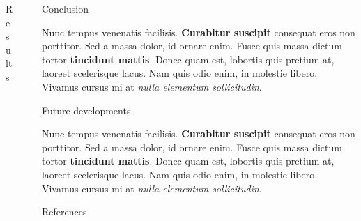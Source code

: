 \documentclass[final]{beamer}
\newlength{\sepwid}
\newlength{\onecolwid}
\begin{document}
\begin{frame}[t]
\begin{columns}[t]
\begin{column}{\onecolwid}
\begin{block}{Results}
\end{block}

\end{column} %

\begin{column}{\sepwid}\end{column} %

\begin{column}{\onecolwid} %


\begin{block}{Conclusion}

Nunc tempus venenatis facilisis. \textbf{Curabitur suscipit} consequat eros non
porttitor. Sed a massa dolor, id ornare enim. Fusce quis massa dictum tortor
\textbf{tincidunt mattis}. Donec quam est, lobortis quis pretium at, laoreet
scelerisque lacus. Nam quis odio enim, in molestie libero. Vivamus cursus mi at
\textit{nulla elementum sollicitudin}.

\end{block}

\begin{block}{Future developments}

Nunc tempus venenatis facilisis. \textbf{Curabitur suscipit} consequat eros non
porttitor. Sed a massa dolor, id ornare enim. Fusce quis massa dictum tortor
\textbf{tincidunt mattis}. Donec quam est, lobortis quis pretium at, laoreet
scelerisque lacus. Nam quis odio enim, in molestie libero. Vivamus cursus mi at
\textit{nulla elementum sollicitudin}.

\end{block}


\begin{block}{References}

\nocite{*} %
\small{
\vspace{0.75in}}

\end{block}


\end{column}
\end{columns}
\end{frame}
\end{document}
